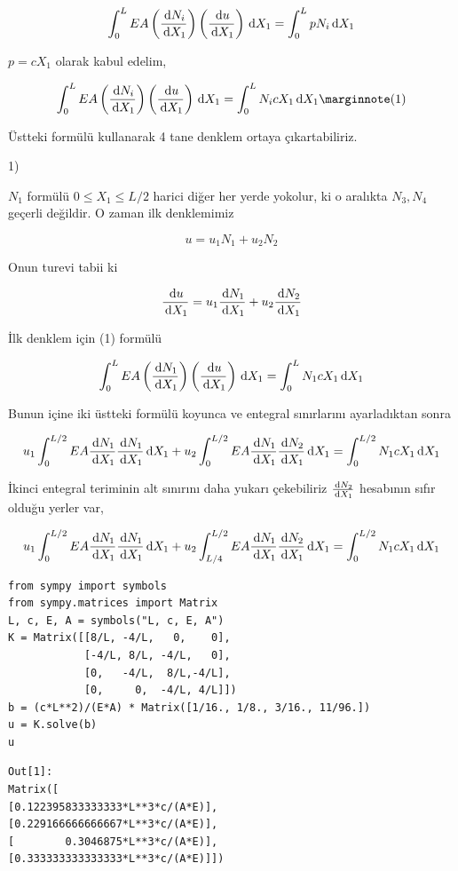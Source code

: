 \documentclass[12pt,fleqn]{article}\usepackage{../../common}
\begin{document}
$$
\int_{0}^{L} EA
\left( \frac{\,\mathrm{d} N_i}{\,\mathrm{d} X_1} \right)
\left( \frac{\,\mathrm{d} u}{\,\mathrm{d} X_1} \right)  \,\mathrm{d} X_1
= \int _{0}^{L} p N_i \,\mathrm{d} X_1
$$

$p = cX_1$ olarak kabul edelim, 

$$
\int_{0}^{L} EA
\left( \frac{\ud N_i}{\ud X_1} \right) 
\left( \frac{\ud u}{\ud X_1} \right) \ud X_1
= \int _{0}^{L} N_i c X_1 \ud X_1
\mlabel{1}
$$

Üstteki formülü kullanarak 4 tane denklem ortaya çıkartabiliriz.

1)

$N_1$ formülü $0 \le X_1 \le L/2$ harici diğer her yerde yokolur, ki o
aralıkta $N_3,N_4$ geçerli değildir. O zaman ilk denklemimiz

$$
u = u_1 N_1 + u_2 N_2 
$$

Onun turevi tabii ki

$$
\frac{\,\mathrm{d} u}{\,\mathrm{d} X_1} = u_1 \frac{\,\mathrm{d} N_1}{\,\mathrm{d} X_1} + u_2 \frac{\,\mathrm{d} N_2}{\,\mathrm{d} X_1} 
$$

İlk denklem için (1) formülü

$$
\int_{0}^{L} EA
\left( \frac{\,\mathrm{d} N_1}{\,\mathrm{d} X_1} \right) 
\left( \frac{\,\mathrm{d} u}{\,\mathrm{d} X_1} \right) \,\mathrm{d} X_1
= \int _{0}^{L} N_1 c X_1 \,\mathrm{d} X_1
$$

Bunun içine iki üstteki formülü koyunca ve entegral sınırlarını ayarladıktan
sonra

$$
u_1 \int_{0}^{L/2} EA \frac{\,\mathrm{d} N_1}{\,\mathrm{d} X_1} \frac{\,\mathrm{d} N_1}{\,\mathrm{d} X_1} \,\mathrm{d} X_1 +
u_2 \int_{0}^{L/2} EA \frac{\,\mathrm{d} N_1}{\,\mathrm{d} X_1} \frac{\,\mathrm{d} N_2}{\,\mathrm{d} X_1} \,\mathrm{d} X_1 =
\int_{0}^{L/2} N_1 c X_1 \,\mathrm{d} X_1
$$

İkinci entegral teriminin alt sınırını daha yukarı çekebiliriz $\frac{\,\mathrm{d} N_2}{\,\mathrm{d} X_1}$
hesabının sıfır olduğu yerler var, 

$$
u_1 \int_{0}^{L/2} EA \frac{\,\mathrm{d} N_1}{\,\mathrm{d} X_1} \frac{\,\mathrm{d} N_1}{\,\mathrm{d} X_1} \,\mathrm{d} X_1 +
u_2 \int_{L/4}^{L/2} EA \frac{\,\mathrm{d} N_1}{\,\mathrm{d} X_1} \frac{\,\mathrm{d} N_2}{\,\mathrm{d} X_1} \,\mathrm{d} X_1 =
\int_{0}^{L/2} N_1 c X_1 \,\mathrm{d} X_1
$$


\begin{verbatim}
from sympy import symbols
from sympy.matrices import Matrix
L, c, E, A = symbols("L, c, E, A")
K = Matrix([[8/L, -4/L,   0,    0],
            [-4/L, 8/L, -4/L,   0],
            [0,   -4/L,  8/L,-4/L],
            [0,     0,  -4/L, 4/L]])           
b = (c*L**2)/(E*A) * Matrix([1/16., 1/8., 3/16., 11/96.])
u = K.solve(b)
u
\end{verbatim}

\begin{verbatim}
Out[1]: 
Matrix([
[0.122395833333333*L**3*c/(A*E)],
[0.229166666666667*L**3*c/(A*E)],
[        0.3046875*L**3*c/(A*E)],
[0.333333333333333*L**3*c/(A*E)]])
\end{verbatim}
\end{document}
